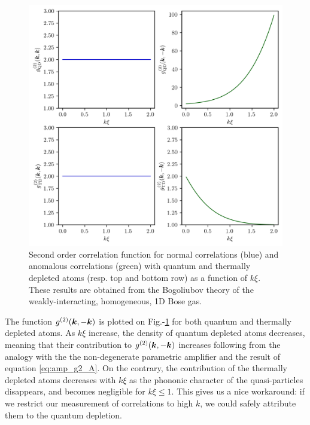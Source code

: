 \begin{figure}
    \centering
    \includegraphics[width=\textwidth]{Fig/Chapter1/g2_bogo.png}
    \caption[Second order correlation function for normal \kk correlations and anomalous \kmk correlations with quantum and thermally depleted atoms]{Second order correlation function for normal \kk correlations (blue) and anomalous \kmk correlations (green) with quantum and thermally depleted atoms (resp. top and bottom row) as a function of $k \xi$. These results are obtained from the Bogoliubov theory of the weakly-interacting, homogeneous, 1D Bose gas.}
    \label{fig:g2_bogo}
\end{figure}

The function $g^{(2)} (\bm{k},-\bm{k})$ is plotted on Fig.-\ref{fig:g2_bogo} for both quantum and thermally depleted atoms. As $k \xi$ increase, the density of quantum depleted atoms decreases, meaning 
that their contribution to $g^{(2)} (\bm{k},-\bm{k})$ increases following from the analogy with the the non-degenerate parametric amplifier and the result of equation \ref{eq:amp_g2_A}. On the contrary, the contribution of the thermally depleted atoms decreases with $k \xi$ as the phononic character of the quasi-particles disappears, and becomes negligible for $k \xi \leq 1$. This gives us a nice workaround: if we restrict our measurement of \kmk correlations to high $k$, we could safely attribute them to the quantum depletion.

